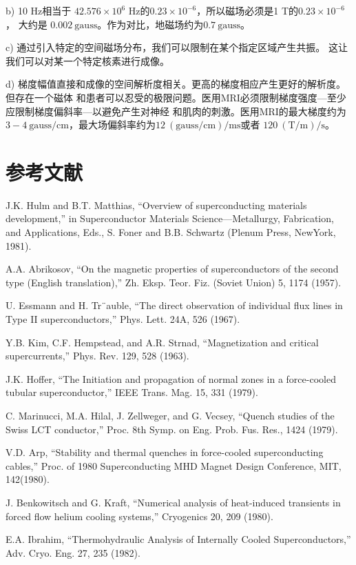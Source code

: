 b) 10 Hz相当于 $42.576×10^6$ Hz的$0.23×10^{−6}$，所以磁场必须是1 T的$0.23×10^{−6}$ ，
大约是 $0.002\ \mathrm{gauss}$。作为对比，地磁场约为$0.7 \ \mathrm{gauss}$。

c) 通过引入特定的空间磁场分布，我们可以限制在某个指定区域产生共振。
这让我们可以对某一个特定核素进行成像。

d) 梯度幅值直接和成像的空间解析度相关。更高的梯度相应产生更好的解析度。但存在一个磁体
和患者可以忍受的极限问题。医用MRI必须限制梯度强度---至少应限制梯度偏斜率---以避免产生对神经
和肌肉的刺激。医用MRI的最大梯度约为$3-4 \ \mathrm{gauss/cm}$，最大场偏斜率约为$12\ \mathrm{(gauss/cm)/ms}$或者
$120\ \mathrm{(T/m)/s}$。

\section*{参考文献}
\noindent [1.1] J.K. Hulm and B.T. Matthias, ``Overview of superconducting materials development,”
in Superconductor Materials Science—Metallurgy, Fabrication, and Applications,
Eds., S. Foner and B.B. Schwartz (Plenum Press, NewYork, 1981).

\noindent [1.2] A.A. Abrikosov, ``On the magnetic properties of superconductors of the second
type (English translation),” Zh. Eksp. Teor. Fiz. (Soviet Union) 5, 1174 (1957).

\noindent [1.3] U. Essmann and H. Tr¨auble, ``The direct observation of individual flux lines in
Type II superconductors,” Phys. Lett. 24A, 526 (1967).

\noindent [1.4] Y.B. Kim, C.F. Hempstead, and A.R. Strnad, ``Magnetization and critical supercurrents,” Phys. Rev. 129, 528 (1963).

\noindent [1.5] J.K. Hoffer, ``The Initiation and propagation of normal zones in a force-cooled
tubular superconductor,” IEEE Trans. Mag. 15, 331 (1979).

\noindent [1.6] C. Marinucci, M.A. Hilal, J. Zellweger, and G. Vecsey, ``Quench studies of the
Swiss LCT conductor,” Proc. 8th Symp. on Eng. Prob. Fus. Res., 1424 (1979).

\noindent [1.7] V.D. Arp, ``Stability and thermal quenches in force-cooled superconducting cables,”
Proc. of 1980 Superconducting MHD Magnet Design Conference, MIT, 142(1980).

\noindent [1.8] J. Benkowitsch and G. Kraft, ``Numerical analysis of heat-induced transients in
forced flow helium cooling systems,” Cryogenics 20, 209 (1980).

\noindent [1.9] E.A. Ibrahim, ``Thermohydraulic Analysis of Internally Cooled Superconductors,”
Adv. Cryo. Eng. 27, 235 (1982).

